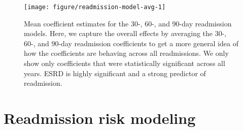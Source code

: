 \documentclass[12pt]{ociamthesis}\usepackage[]{graphicx}\usepackage[]{color}
\newenvironment{knitrout}{}{} %
\begin{document}









\begin{knitrout}
\color{fgcolor}\begin{figure}

{\centering \texttt{[image: figure/readmission-model-avg-1]} 

}

\caption[Mean coefficient estimates for the 30-, 60-, and 90-day readmission models]{Mean coefficient estimates for the 30-, 60-, and 90-day readmission models. Here, we capture the overall effects by averaging the 30-, 60-, and 90-day readmission coefficients to get a more general idea of how the coefficients are behaving across all readmissions. We only show only coefficients that were statistically significant across all years. ESRD is highly significant and a strong predictor of readmission.}\label{fig:readmission-model-avg}
\end{figure}


\end{knitrout}
\label{fig:readmission-model-avg}


\section{Readmission risk modeling}
\end{document}
